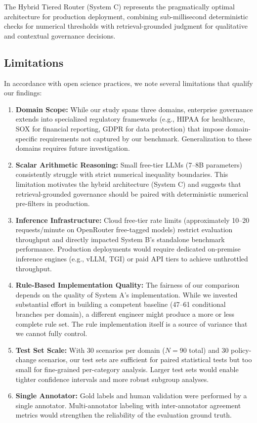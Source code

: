 \documentclass[sigconf,screen]{acmart}
\begin{document}
The Hybrid Tiered Router (System C) represents the pragmatically optimal architecture for production deployment, combining sub-millisecond deterministic checks for numerical thresholds with retrieval-grounded judgment for qualitative and contextual governance decisions.

\subsection{Limitations}
In accordance with open science practices, we note several limitations that qualify our findings:
\begin{enumerate}[leftmargin=*]
    \item \textbf{Domain Scope:} While our study spans three domains, enterprise governance extends into specialized regulatory frameworks (e.g., HIPAA for healthcare, SOX for financial reporting, GDPR for data protection) that impose domain-specific requirements not captured by our benchmark. Generalization to these domains requires future investigation.
    
    \item \textbf{Scalar Arithmetic Reasoning:} Small free-tier LLMs (7--8B parameters) consistently struggle with strict numerical inequality boundaries. This limitation motivates the hybrid architecture (System C) and suggests that retrieval-grounded governance should be paired with deterministic numerical pre-filters in production.
    
    \item \textbf{Inference Infrastructure:} Cloud free-tier rate limits (approximately 10--20 requests/minute on OpenRouter free-tagged models) restrict evaluation throughput and directly impacted System B's standalone benchmark performance. Production deployments would require dedicated on-premise inference engines (e.g., vLLM, TGI) or paid API tiers to achieve unthrottled throughput.
    
    \item \textbf{Rule-Based Implementation Quality:} The fairness of our comparison depends on the quality of System A's implementation. While we invested substantial effort in building a competent baseline (47--61 conditional branches per domain), a different engineer might produce a more or less complete rule set. The rule implementation itself is a source of variance that we cannot fully control.
    
    \item \textbf{Test Set Scale:} With 30 scenarios per domain ($N=90$ total) and 30 policy-change scenarios, our test sets are sufficient for paired statistical tests but too small for fine-grained per-category analysis. Larger test sets would enable tighter confidence intervals and more robust subgroup analyses.
    
    \item \textbf{Single Annotator:} Gold labels and human validation were performed by a single annotator. Multi-annotator labeling with inter-annotator agreement metrics would strengthen the reliability of the evaluation ground truth.
\end{enumerate}
\end{document}
